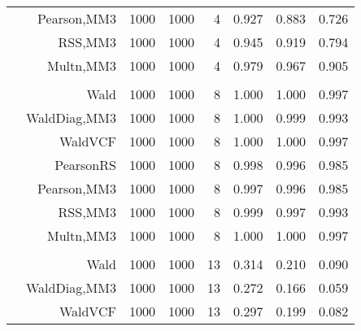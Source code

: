 \documentclass[
]{article}
\begin{document}
\begin{table}[H]
{\begin{tabular}[t]{lrrrrrrr}
\hspace{1em} & Pearson,MM3 & 1000 & 1000 & 4 & 0.927 & 0.883 & 0.726\\

\hspace{1em} & RSS,MM3 & 1000 & 1000 & 4 & 0.945 & 0.919 & 0.794\\

\hspace{1em} & Multn,MM3 & 1000 & 1000 & 4 & 0.979 & 0.967 & 0.905\\
\cmidrule{1-8}
\addlinespace[0.3em]
\multicolumn{8}{l}{\textbf{1F 15V}}\\
\hspace{1em} & Wald & 1000 & 1000 & 8 & 1.000 & 1.000 & 0.997\\

\hspace{1em} & WaldDiag,MM3 & 1000 & 1000 & 8 & 1.000 & 0.999 & 0.993\\

\hspace{1em} & WaldVCF & 1000 & 1000 & 8 & 1.000 & 1.000 & 0.997\\

\hspace{1em} & PearsonRS & 1000 & 1000 & 8 & 0.998 & 0.996 & 0.985\\

\hspace{1em} & Pearson,MM3 & 1000 & 1000 & 8 & 0.997 & 0.996 & 0.985\\

\hspace{1em} & RSS,MM3 & 1000 & 1000 & 8 & 0.999 & 0.997 & 0.993\\

\hspace{1em} & Multn,MM3 & 1000 & 1000 & 8 & 1.000 & 1.000 & 0.997\\
\cmidrule{1-8}
\addlinespace[0.3em]
\multicolumn{8}{l}{\textbf{2F 10V}}\\
\hspace{1em} & Wald & 1000 & 1000 & 13 & 0.314 & 0.210 & 0.090\\

\hspace{1em} & WaldDiag,MM3 & 1000 & 1000 & 13 & 0.272 & 0.166 & 0.059\\

\hspace{1em} & WaldVCF & 1000 & 1000 & 13 & 0.297 & 0.199 & 0.082\\


\end{tabular}}
\end{table}
\end{document}
